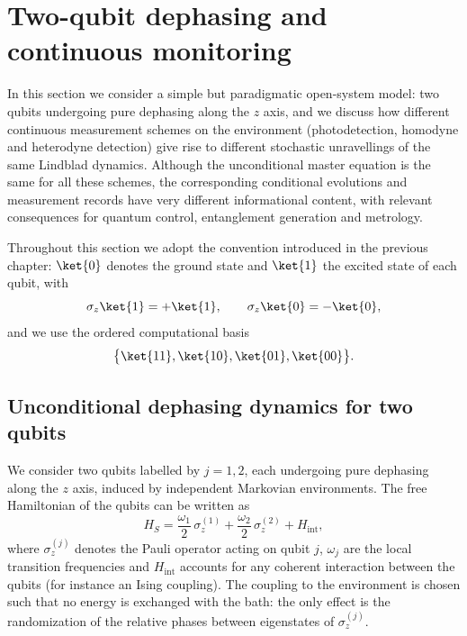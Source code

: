 \section{Two-qubit dephasing and continuous monitoring}
\label{sec:two_qubit_dephasing}

In this section we consider a simple but paradigmatic open-system model: two qubits undergoing pure dephasing along the $z$ axis, and we discuss how different continuous measurement schemes on the environment (photodetection, homodyne and heterodyne detection) give rise to different stochastic unravellings of the same Lindblad dynamics.  
Although the unconditional master equation is the same for all these schemes, the corresponding conditional evolutions and measurement records have very different informational content, with relevant consequences for quantum control, entanglement generation and metrology.

Throughout this section we adopt the convention introduced in the previous chapter: $\ket{0}$ denotes the ground state and $\ket{1}$ the excited state of each qubit, with
\begin{equation}
	\sigma_z \ket{1} = + \ket{1},
	\qquad
	\sigma_z \ket{0} = - \ket{0},
\end{equation}
and we use the ordered computational basis
\begin{equation}
	\bigl\{ \ket{11}, \ket{10}, \ket{01}, \ket{00} \bigr\}.
\end{equation}

\subsection{Unconditional dephasing dynamics for two qubits}
\label{subsec:two_qubit_unconditional}

We consider two qubits labelled by $j=1,2$, each undergoing pure dephasing along the $z$ axis, induced by independent Markovian environments.  
The free Hamiltonian of the qubits can be written as
\begin{equation}
	H_S = \frac{\omega_1}{2}\,\sigma_z^{(1)} + \frac{\omega_2}{2}\,\sigma_z^{(2)} + H_{\mathrm{int}},
\end{equation}
where $\sigma_z^{(j)}$ denotes the Pauli operator acting on qubit $j$, $\omega_j$ are the local transition frequencies and $H_{\mathrm{int}}$ accounts for any coherent interaction between the qubits (for instance an Ising coupling).  
The coupling to the environment is chosen such that no energy is exchanged with the bath: the only effect is the randomization of the relative phases between eigenstates of $\sigma_z^{(j)}$.

